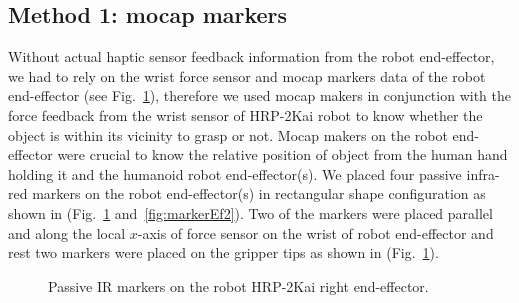 \subsection{Method 1: mocap markers}
Without actual haptic sensor feedback information from the robot end-effector, we had to rely on the wrist force sensor and mocap markers data of the robot end-effector (see Fig.~\ref{fig:markerEf}), therefore we used mocap makers in conjunction with the force feedback from the wrist sensor of HRP-2Kai robot to know whether the object is within its vicinity to grasp or not. Mocap makers on the robot end-effector were crucial to know the relative position of object from the human hand holding it and the humanoid robot end-effector(s). We placed four passive infra-red markers on the robot end-effector(s) in rectangular shape configuration as shown in (Fig.~\ref{fig:markerEf} and~\ref{fig:markerEf2}). Two of the markers were placed parallel and along the local $x$-axis of force sensor on the wrist of robot end-effector and rest two markers were placed on the gripper tips as shown in (Fig.~\ref{fig:markerEf}).

\begin{figure}[ht]
	\caption{Passive IR markers on the robot HRP-2Kai right end-effector.}
	\label{fig:markerEf}
\end{figure} 


